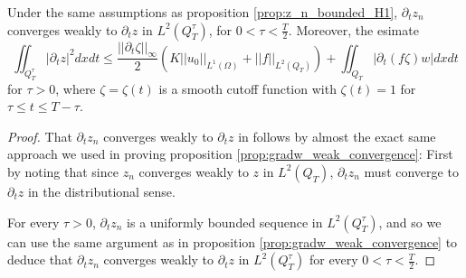 \documentclass[11pt, a4paper]{article}
\begin{document}
\begin{proposition}
\label{prop:z_t_estimate}
Under the same assumptions as proposition \ref{prop:z_n_bounded_H1}, $\partial_t z_n$ converges weakly to $\partial_t z$ in $L^2(Q_T^\tau)$, for $0 < \tau < \frac{T}{2}$. Moreover, the esimate
\begin{equation}
\label{z_t_estimate}
\iint_{Q_T^\tau} |\partial_t z|^2 dxdt \leq \frac{||\partial_t \zeta||_\infty}{2}\left( K||u_0||_{L^1(\Omega)} + ||f||_{L^2(Q_T)}\right) + \iint_{Q_T}|\partial_t (f \zeta ) w| dxdt
\end{equation}
for $\tau >0$, where $\zeta=\zeta(t)$ is a smooth cutoff function with $\zeta(t)=1$ for $\tau \leq t \leq T-\tau$.

\end{proposition}
\begin{proof}
That $\partial_t z_n$ converges weakly to $\partial_t z$ in follows by almost the exact same approach we used in proving proposition \ref{prop:gradw_weak_convergence}: First by noting that since $z_n$ converges weakly to $z$ in $L^2(Q_T)$, $\partial_t z_n$ must converge to $\partial_t z$ in the distributional sense.

For every $\tau > 0$, $\partial_t z_n$ is a uniformly bounded sequence in $L^2(Q_T^\tau)$, and so we can use the same argument as in proposition \ref{prop:gradw_weak_convergence} to deduce that $\partial_t z_n$ converges weakly to $\partial_t z$ in $L^2(Q_T^\tau)$ for every $0 < \tau < \frac{T}{2}$.


\end{proof}
\end{document}
